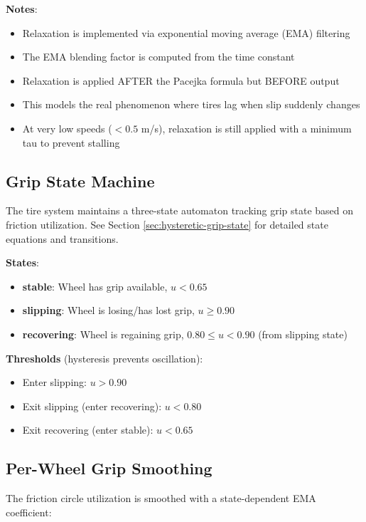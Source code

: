 \textbf{Notes}:
\begin{itemize}
  \item Relaxation is implemented via exponential moving average (EMA) filtering
  \item The EMA blending factor is computed from the time constant
  \item Relaxation is applied AFTER the Pacejka formula but BEFORE output
  \item This models the real phenomenon where tires lag when slip suddenly changes
  \item At very low speeds ($< 0.5$ m/s), relaxation is still applied with a minimum tau to prevent stalling
\end{itemize}

\subsection{Grip State Machine}

\label{sec:grip-state-machine}

The tire system maintains a three-state automaton tracking grip state based on friction utilization. See Section \ref{sec:hysteretic-grip-state} for detailed state equations and transitions.

\textbf{States}:
\begin{itemize}
  \item \textbf{stable}: Wheel has grip available, $u < 0.65$
  \item \textbf{slipping}: Wheel is losing/has lost grip, $u \ge 0.90$
  \item \textbf{recovering}: Wheel is regaining grip, $0.80 \le u < 0.90$ (from slipping state)
\end{itemize}

\textbf{Thresholds} (hysteresis prevents oscillation):
\begin{itemize}
  \item Enter slipping: $u > 0.90$
  \item Exit slipping (enter recovering): $u < 0.80$
  \item Exit recovering (enter stable): $u < 0.65$
\end{itemize}

\subsection{Per-Wheel Grip Smoothing}

The friction circle utilization is smoothed with a state-dependent EMA coefficient:

